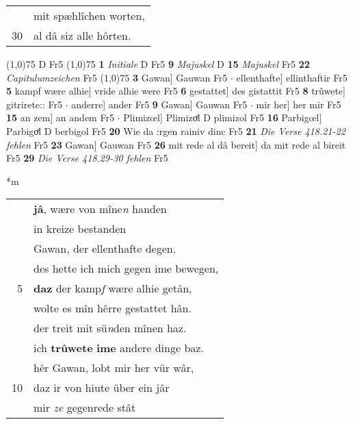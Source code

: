 \documentclass[8pt,a4paper,notitlepage]{article}
\begin{document}
\begin{table}[ht]
\begin{minipage}[t]{0.5\linewidth}
\begin{tabular}{rl}
 & mit spæhlîchen worten,\\ 
30 & al dâ siz alle hôrten.\\ 
\end{tabular}
\scriptsize
\line(1,0){75} \newline
D Fr5 \newline
\line(1,0){75} \newline
\textbf{1} \textit{Initiale} D Fr5  \textbf{9} \textit{Majuskel} D  \textbf{15} \textit{Majuskel} Fr5  \textbf{22} \textit{Capitulumzeichen} Fr5  \newline
\line(1,0){75} \newline
\textbf{3} Gawan] Gauwan Fr5  $\cdot$ ellenthafte] ellinthaftir Fr5 \textbf{5} kampf wære alhie] vride alhie were Fr5 \textbf{6} gestattet] des gistattit Fr5 \textbf{8} trûwete] gitrirete:: Fr5  $\cdot$ anderre] ander Fr5 \textbf{9} Gawan] Gauwan Fr5  $\cdot$ mir her] her mir Fr5 \textbf{15} an zem] an andem Fr5  $\cdot$ Plimizœl] Plimizoͤl D plimizol Fr5 \textbf{16} Parbigœl] Parbigoͤl D berbigol Fr5 \textbf{20} Wie da :rgen rainiv dinc Fr5 \textbf{21} \textit{Die Verse 418.21-22 fehlen} Fr5  \textbf{23} Gawan] Gauwan Fr5 \textbf{26} mit rede al dâ bereit] da mit rede al bireit Fr5 \textbf{29} \textit{Die Verse 418.29-30 fehlen} Fr5  \newline
\end{minipage}
\hspace{0.5cm}
\begin{minipage}[t]{0.5\linewidth}
\small
\begin{center}*m
\end{center}
\begin{tabular}{rl}
 & \textbf{jâ}, wære von mîne\textit{n} handen\\ 
 & in kreize bestanden\\ 
 & Gawan, der ellenthafte degen.\\ 
 & des hette ich mich gegen ime bewegen,\\ 
5 & \textbf{daz} der kamp\textit{f} wære alhie getân,\\ 
 & wolte es mîn hêrre gestattet hân.\\ 
 & der treit mit sü\textit{n}den mînen haz.\\ 
 & ich \textbf{trûwete} \textbf{ime} andere dinge baz.\\ 
 & hêr Gawan, lobt mir her vür wâr,\\ 
10 & daz ir von hiute über ein jâr\\ 
 & mir \textit{ze} gegenrede stât\\ 

\end{tabular}
\end{minipage}
\end{table}
\end{document}

